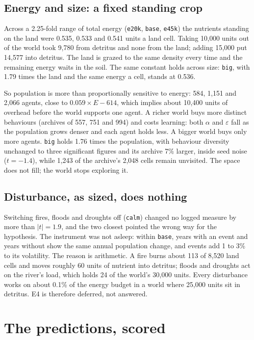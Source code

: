 \documentclass[letterpaper]{article}
\newcommand{\cond}[1]{\texttt{#1}}
\begin{document}
\subsection{Energy and size: a fixed standing crop}

Across a 2.25-fold range of total energy (\cond{e20k}, \cond{base}, \cond{e45k}) the nutrients standing
on the land were 0.535, 0.533 and 0.541 units a land cell. Taking 10,000 units out of the world took
9,780 from detritus and none from the land; adding 15,000 put 14,577 into detritus. The land is
grazed to the same density every time and the remaining energy waits in the soil. The same constant
holds across size: \cond{big}, with 1.79 times the land and the same energy a cell, stands at 0.536.

So population is more than proportionally sensitive to energy: 584, 1,151 and 2,066 agents, close to
$0.059 \times E - 614$, which implies about 10,400 units of overhead before the world supports one
agent. A richer world buys more distinct behaviours (archives of 557, 751 and 994) and costs
learning: both $\alpha$ and $\varepsilon$ fall as the population grows denser and each agent holds
less. A bigger world buys only more agents. \cond{big} holds 1.76 times the population, with
behaviour diversity unchanged to three significant figures and its archive 7\% larger, inside seed
noise ($t = -1.4$), while 1,243 of the archive's 2,048 cells remain unvisited. The space does not
fill; the world stops exploring it.

\subsection{Disturbance, as sized, does nothing}

Switching fires, floods and droughts off (\cond{calm}) changed no logged measure by more than
$|t| = 1.9$, and the two closest pointed the wrong way for the hypothesis. The instrument was not
asleep: within \cond{base}, years with an event and years without show the same annual population
change, and events add 1 to 3\% to its volatility. The reason is arithmetic. A fire burns about 113 of
8,520 land cells and moves roughly 60 units of nutrient into detritus; floods and droughts act on the
river's load, which holds 24 of the world's 30,000 units. Every disturbance works on about 0.1\% of
the energy budget in a world where 25,000 units sit in detritus. E4 is therefore deferred, not
answered.

\section{The predictions, scored}
\end{document}
